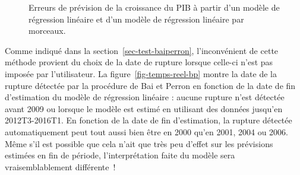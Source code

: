 \documentclass[
  a4paper,
  DIV=11,
  numbers=noendperiod,
  french]{scrartcl}
\newcommand\1{{\mathds 1}}
\theoremstyle{remark}
\begin{document}
\begin{figure}

\caption{\label{fig-prev-piecereg}Erreurs de prévision de la croissance
du PIB à partir d'un modèle de régression linéaire et d'un modèle de
régression linéaire par morceaux.}


\end{figure}%

Comme indiqué dans la section~\ref{sec-test-baiperron}, l'inconvénient
de cette méthode provient du choix de la date de rupture lorsque
celle-ci n'est pas imposée par l'utilisateur. La
figure~\ref{fig-temps-reel-bp} montre la date de la rupture détectée par
la procédure de Bai et Perron en fonction de la date de fin d'estimation
du modèle de régression linéaire : aucune rupture n'est détectée avant
2009 ou lorsque le modèle est estimé en utilisant des données jusqu'en
2012T3-2016T1. En fonction de la date de fin d'estimation, la rupture
détectée automatiquement peut tout aussi bien être en 2000 qu'en 2001,
2004 ou 2006. Même s'il est possible que cela n'ait que très peu d'effet
sur les prévisions estimées en fin de période, l'interprétation faite du
modèle sera vraisemblablement différente~!
\end{document}
